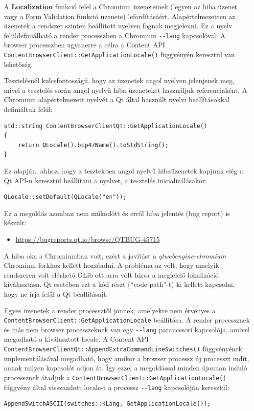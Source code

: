 \documentclass[12pt]{report}
\let\origurl\url
\renewcommand{\url}[1]{%
    \textcolor{blue}{\origurl{#1}}
}
\newcommand{\qtbug}[1]{%
    \textcolor{qtred}{\origurl{https://bugreports.qt.io/browse/QTBUG-#1}}
}
\begin{document}
\noindent
A \textbf{Localization} funkció felel a Chromium üzeneteinek (legyen az hiba üzenet vagy
a Form Validation funkció üzenete) lefordításáért. Alapértelmezetten az üzenetek a
rendszer szinten beállított nyelven fognak megjelenni. Ez a nyelv felüldefiniálható
a render processzben a Chromium \texttt{-{}-lang} kapcsolóval. A browser processzben
ugyanerre a célra a Content API \texttt{ContentBrowserClient::GetApplicationLocale()}
függvényén keresztül van lehetőség.

Tesztelésnél kulcsfontosságú, hogy az üzenetek angol nyelven jelenjenek meg, mivel a
tesztelés során angol nyelvű hiba üzeneteket használjuk referenciaként. A Chromium
alapértelmezett nyelvét a Qt által használt nyelvi beállításokkal definiáltuk felül:
\begin{verbatim}
std::string ContentBrowserClientQt::GetApplicationLocale()
{
    return QLocale().bcp47Name().toStdString();
}
\end{verbatim}
Ez alapján, ahhoz, hogy a tesztekben angol nyelvű hibaüzenetek kapjunk elég a Qt API-n
keresztül beállítani a nyelvet, a tesztelés inicializálásakor:
\begin{verbatim}
QLocale::setDefault(QLocale("en"));
\end{verbatim}
Ez a megoldás azonban nem működött és erről hiba jelentés (bug report) is készült:
\begin{center}
    \begin{issuebox}
        \begin{itemize}
            \renewcommand{\labelitemi}{\textcolor{qtred}{$\blacktriangleright$}}
            \item \qtbug{45715}
        \end{itemize}
    \end{issuebox}
\end{center}

A hiba oka a Chromiumban volt, ezért a javítást a \textit{qtwebengine-chromium} Chromium
forkhoz kellett hozzáadni. A probléma az volt, hogy amelyik rendszeren volt elérhető
GLib ott arra volt bízva a megfelelő lokalizáció kiválasztása. Qt esetében ezt a kód részt
(``code path''-t) ki kellett kapcsolni, hogy ne írja felül a Qt beállításait.

Egyes üzenetek a render processztől jönnek, amelyekre nem érvényes a
\texttt{ContentBrowserClient::GetApplicationLocale} beállítása. A render processznek
és más nem browser processzeknek van egy \texttt{-{}-lang} parancssori kapcsolója, amivel
megadható a kiválasztott locale. A Content API
\texttt{ContentBrowserClientQt::AppendExtraCommandLineSwitches()}
függvényének implementálásával megadható, hogy amikor a browser processz új processzt indít,
annak milyen kapcsolót adjon át. Így ezzel a megoldással minden újonnan induló processznek
átadjuk a \texttt{ContentBrowserClient::GetApplicationLocale()} függvény által visszaadott
locale-t a processz \texttt{-{}-lang} kapcsolóján keresztül:
\begin{verbatim}
AppendSwitchASCII(switches::kLang, GetApplicationLocale());
\end{verbatim}
\end{document}
